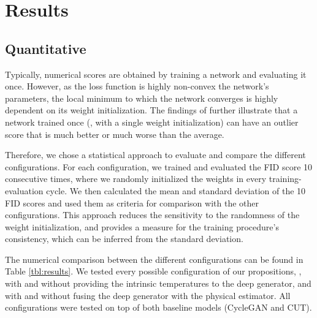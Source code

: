 \section{Results}
\subsection{Quantitative}
Typically, numerical scores are obtained by training a network and evaluating it once.
However, as the loss function is highly non-convex \wrt the network's parameters, the local minimum to which the network converges is highly dependent on its weight initialization.
The findings of \cite{picard2021torch} further illustrate that a network trained once (\ie, with a single weight initialization) can have an outlier score that is much better or much worse than the average.

Therefore, we chose a statistical approach to evaluate and compare the different configurations.
For each configuration, we trained and evaluated the FID score 10 consecutive times, where we randomly initialized the weights in every training-evaluation cycle.
We then calculated the mean and standard deviation of the 10 FID scores and used them as criteria for comparison with the other configurations.
This approach reduces the sensitivity to the randomness of the weight initialization, and provides a measure for the training procedure's consistency, which can be inferred from the standard deviation.

The numerical comparison between the different configurations can be found in Table \ref{tbl:results}.
We tested every possible configuration of our propositions, \ie, with and without providing the intrinsic temperatures  to the deep generator, and with and without fusing the deep generator with the physical estimator.
All configurations were tested on top of both baseline models (CycleGAN and CUT).

